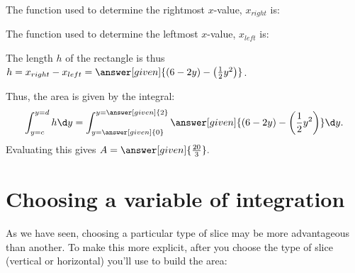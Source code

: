 \documentclass{ximera}
\begin{document}
\begin{example}
\begin{explanation}
\begin{image}
            \end{image}
            
            
The function used to determine the rightmost $x$-value, $x_{right}$ is:
\begin{multipleChoice}
\end{multipleChoice}

The function used to determine the leftmost $x$-value, $x_{left}$ is:
\begin{multipleChoice}
\end{multipleChoice}

The length $h$ of the rectangle is thus $h=x_{right}-x_{left} = \answer[given]{(6-2y)-\left(\frac{1}{2}y^2\right)}$.

Thus, the area is given by the integral:
  \[
 \int_{y=c}^{y=d} h \d y =  \int_{y=\answer[given]{0}}^{y=\answer[given]{2}} \answer[given]{(6-2y)-\left(\frac{1}{2}y^2\right)} \d y .
  \]
  Evaluating this gives $A= \answer[given]{\frac{20}{3}}.$
 \end{explanation}
 
\end{example}

\section{Choosing a variable of integration}
As we have seen, choosing a particular type of slice may be more advantageous than another.  To make this more explicit, after you choose the type of slice (vertical or horizontal) you'll use to build the area:
\end{document}
